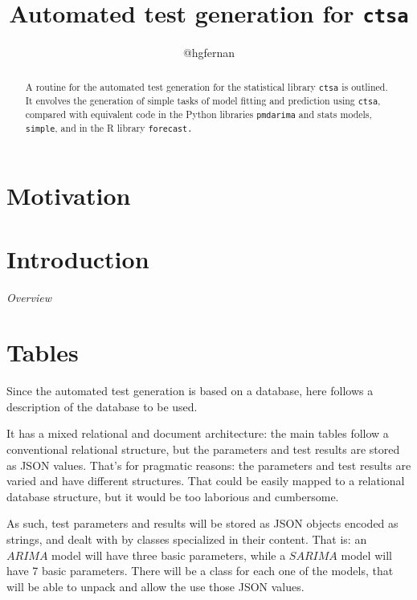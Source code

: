 \documentclass[a4paper,10pt]{article}
\title{Automated test generation for {\tt ctsa}}
\author{@hgfernan}
\begin{document}
\maketitle

\begin{abstract}
A routine for the automated test generation for the statistical
library {\tt ctsa} is outlined. It envolves the generation of
simple tasks of model fitting and prediction using {\tt ctsa},
compared with equivalent code in the Python libraries
{\tt pmdarima} and stats models, {\tt simple}, and in the R
library {\tt forecast.}
\end{abstract}

\section{Motivation}

\section{Introduction}

{\em Overview}

\section{Tables}

Since the automated test generation is based on a database, here
follows a description of the database to be used.

It has a mixed relational and document architecture: the main
tables follow a conventional relational structure, but the
parameters and test results are stored as JSON values. That's for
pragmatic reasons: the parameters and test results are varied and
have different structures. That could be easily mapped to a
relational database structure, but it would be too laborious and
cumbersome.

As such, test parameters and results will be stored as JSON
objects encoded as strings, and dealt with by classes specialized
in their content. That is:  an $ARIMA$ model will have three basic
parameters, while a $SARIMA$ model will have 7 basic parameters.
There will be a class for each one of the models, that will be
able to unpack and allow the use those JSON values.
\end{document}
